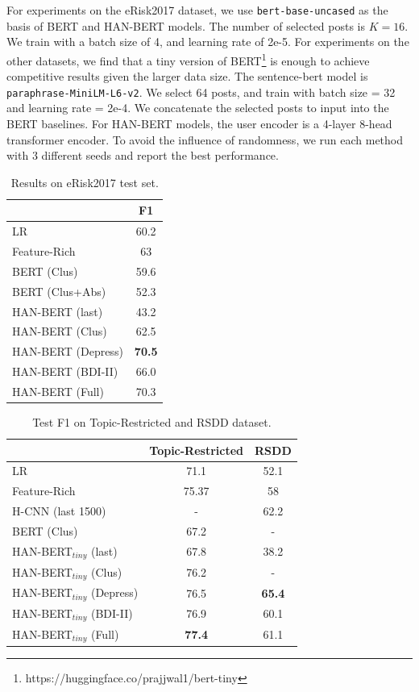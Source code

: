 For experiments on the eRisk2017 dataset, we use \texttt{bert-base-uncased} as the basis of BERT and HAN-BERT models. The number of selected posts is $K=16$. We train with a batch size of 4, and learning rate of 2e-5. For experiments on the other datasets, we find that a tiny version of BERT\footnote{https://huggingface.co/prajjwal1/bert-tiny} is enough to achieve competitive results given the larger data size. The sentence-bert model is \texttt{paraphrase-MiniLM-L6-v2}. We select 64 posts, and train with batch size = 32 and learning rate = 2e-4. We concatenate the selected posts to input into the BERT baselines. For HAN-BERT models, the user encoder is a 4-layer 8-head transformer encoder. To avoid the influence of randomness, we run each method with 3 different seeds and report the best performance.

\begin{table}[t]
    \centering
    \small
    \begin{tabular}{l|c}
        \hline
        {} & F1 \\
        \hline
        LR & 60.2 \\
        Feature-Rich & 63 \\
        \hline
        BERT (Clus) & 59.6 \\
        BERT (Clus+Abs) & 52.3 \\
        HAN-BERT (last) & 43.2 \\
        HAN-BERT (Clus) & 62.5 \\
        \hline
        HAN-BERT (Depress) & \textbf{70.5} \\
        HAN-BERT (BDI-II) & 66.0 \\
        HAN-BERT (Full) & 70.3 \\
        \hline
    \end{tabular}
    \caption{\label{table:erisk2017} Results on eRisk2017 test set.}
\end{table}


\begin{table}[t]
    \centering
    \small
    \begin{tabular}{l|cc}
        \hline
        {} & Topic-Restricted & RSDD \\
        \hline
        LR & 71.1 & 52.1 \\
        Feature-Rich & 75.37 & 58 \\
        \hline
        H-CNN (last 1500) & - & 62.2 \\
        BERT (Clus) & 67.2 & - \\
        HAN-BERT$_{tiny}$ (last) & 67.8 & 38.2 \\
        HAN-BERT$_{tiny}$ (Clus) & 76.2 & - \\
        \hline
        HAN-BERT$_{tiny}$ (Depress) & 76.5 & \textbf{65.4} \\
        HAN-BERT$_{tiny}$ (BDI-II) & 76.9 & 60.1 \\
        HAN-BERT$_{tiny}$ (Full) & \textbf{77.4} & 61.1 \\
        \hline
    \end{tabular}
    \caption{\label{table:rsdd_wolohan} Test F1 on Topic-Restricted and RSDD dataset.}
\end{table}


